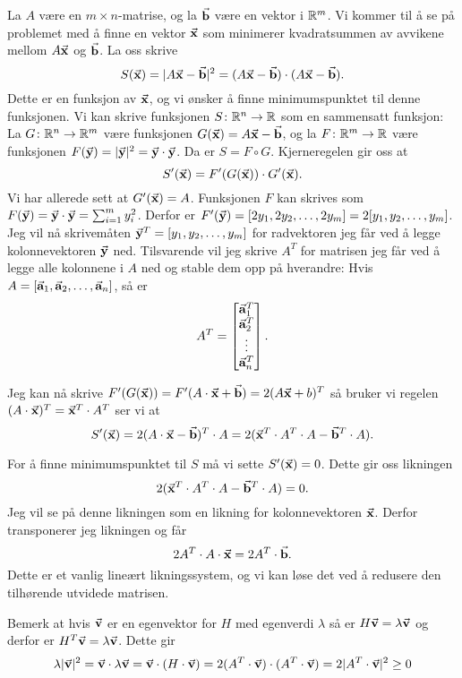 \begin{eksempel}
  La $A$ være en $m \times n$-matrise, og la $\vec{\mathbf{b}}$ være en vektor i $\mathbb{R}^m$.
  Vi kommer til å se på problemet med å finne en vektor $\vec{\mathbf{x}}$ som minimerer
  kvadratsummen av avvikene mellom $A\vec{\mathbf{x}}$ og $\vec{\mathbf{b}}$. La oss skrive
  $$S(\vec{\mathbf{x}}) = |A\vec{\mathbf{x}} - \vec{\mathbf{b}}|^2 = (A\vec{\mathbf{x}} - \vec{\mathbf{b}}) \cdot (A\vec{\mathbf{x}} - \vec{\mathbf{b}}).$$  
  Dette er en funksjon av $\vec{\mathbf{x}}$, og vi ønsker å finne minimumspunktet til denne funksjonen.
  Vi kan skrive funksjonen $S \colon \mathbb{R}^n \to \mathbb{R}$ som en sammensatt funksjon: La $G \colon \mathbb{R}^n \to \mathbb{R}^m$
  være funksjonen $G(\vec{\mathbf{x}}) = A\vec{\mathbf{x}} - \vec{\mathbf{b}}$, og la $F \colon \mathbb{R}^m \to \mathbb{R}$ være funksjonen
  $F(\vec{\mathbf{y}}) = |\vec{\mathbf{y}}|^2 = \vec{\mathbf{y}} \cdot \vec{\mathbf{y}}$. Da er $S = F \circ G$.
  Kjerneregelen gir oss at
  $$S'(\vec{\mathbf{x}}) = F'(G(\vec{\mathbf{x}})) \cdot G'(\vec{\mathbf{x}}).$$
  Vi har allerede sett at $G'(\vec{\mathbf{x}}) = A$.
  Funksjonen $F$ kan skrives som $F(\vec{\mathbf{y}}) = \vec{\mathbf{y}} \cdot \vec{\mathbf{y}} = \sum_{i=1}^m y_i^2$.
  Derfor er $F'(\vec{\mathbf{y}}) = [2y_1, 2y_2, \ldots, 2y_m] = 2[y_1, y_2, \dots, y_m]$.
  Jeg vil nå skrivemåten $\vec{\mathbf{y}}^T = [y_1, y_2, \dots, y_m]$ for radvektoren jeg får
  ved å legge kolonnevektoren $\vec{\mathbf{y}}$ ned.
  Tilsvarende vil jeg skrive $A^T$ for matrisen jeg får ved å legge alle
  kolonnene i $A$ ned og stable dem opp på hverandre:
  Hvis $A = [\vec{\mathbf{a}}_1, \vec{\mathbf{a}}_2, \dots, \vec{\mathbf{a}}_n]$, så er
  $$A^T = \begin{bmatrix}\vec{\mathbf{a}}_1^T \\ \vec{\mathbf{a}}_2^T \\ \vdots \\ \vec{\mathbf{a}}_n^T\end{bmatrix}.$$

  Jeg kan nå skrive $F'(G(\vec{\mathbf{x}})) = F'(A\cdot \vec{\mathbf{x}} + \vec{\mathbf{b}}) = 2(A
  \vec{\mathbf{x}} + b)^T$ så
  bruker vi regelen $(A \cdot \vec{\mathbf{x}})^T = \vec{\mathbf{x}}^T \cdot A^T$ ser vi at
  $$S'(\vec{\mathbf{x}}) = 2(A\cdot \vec{\mathbf{x}} - \vec{\mathbf{b}})^T \cdot A = 2(\vec{\mathbf{x}}^T
  \cdot A^T \cdot A - \vec{\mathbf{b}}^T \cdot A).$$

  For å finne minimumspunktet til $S$ må vi sette $S'(\vec{\mathbf{x}}) = 0$. Dette gir
  oss likningen
  $$2(\vec{\mathbf{x}}^T \cdot A^T \cdot A - \vec{\mathbf{b}}^T \cdot A) = 0.$$
  Jeg vil se på denne likningen som en likning for kolonnevektoren $\vec{\mathbf{x}}$.
  Derfor transponerer jeg likningen og får
  $$2A^T \cdot A \cdot \vec{\mathbf{x}} = 2A^T \cdot \vec{\mathbf{b}}.$$
  Dette er et vanlig lineært likningssystem, og vi kan løse det ved å redusere
  den tilhørende utvidede matrisen.

  Bemerk at hvis $\vec{\mathbf{v}}$ er en egenvektor for $H$ med egenverdi $\lambda$ så er
  $H\vec{\mathbf{v}} = \lambda \vec{\mathbf{v}}$ og derfor er $H^T \vec{\mathbf{v}} = \lambda \vec{\mathbf{v}}$.
  Dette gir 
  $$\lambda |\vec{\mathbf{v}}|^2 = \vec{\mathbf{v}} \cdot \lambda \vec{\mathbf{v}} = 
  \vec{\mathbf{v}} \cdot (H \cdot \vec{\mathbf{v}}) = 2(A^T \cdot \vec{\mathbf{v}}) \cdot
  (A^T \cdot \vec{\mathbf{v}}) = 2|A^T \cdot \vec{\mathbf{v}}|^2 \ge 0$$
\end{eksempel}

